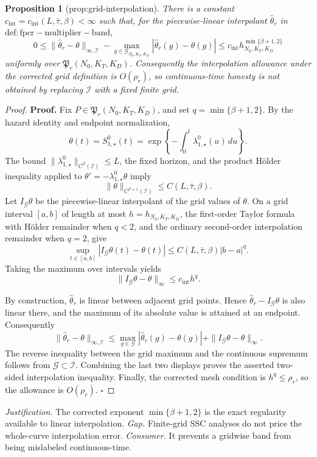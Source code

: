 \documentclass{article}
\newtheorem{proposition}{Proposition}
\begin{document}
\begin{proposition}[prop:grid-interpolation]\label{prop:grid-interpolation}
There is a constant \(c_{\mathrm{int}}=c_{\mathrm{int}}(L,\bar\tau,\beta)<\infty\) such that, for the piecewise-linear interpolant \(\widehat\theta_r\) in \(\mathrm{def:fpcr-multiplier-band}\),
\[
 0\le \|\widehat\theta_r-\theta\|_{\infty,\mathcal I}
 -\max_{g\in\mathcal G_{N_0,K_T,K_D}}|\widehat\theta_r(g)-\theta(g)|
 \le c_{\mathrm{int}}h_{N_0,K_T,K_D}^{\min\{\beta+1,2\}}
\]
uniformly over \(\mathfrak P_r(N_0,K_T,K_D)\). Consequently the interpolation allowance under the corrected grid definition is \(O(\rho_r)\), so continuous-time honesty is not obtained by replacing \(\mathcal I\) with a fixed finite grid.
\end{proposition}
\begin{proof}
\textbf{Proof.}
Fix \(P\in\mathfrak P_r(N_0,K_T,K_D)\), and set \(q=\min\{\beta+1,2\}\).  By the hazard identity and endpoint normalization,
\[
 \theta(t)=S^0_{1,\star}(t)
 =\exp\left\{-\int_0^t\lambda^0_{1,\star}(u)\,du\right\}.
\]
The bound \(\|\lambda^0_{1,\star}\|_{C^\beta(\mathcal I)}\le L\), the fixed horizon, and the product Hölder inequality applied to \(\theta'=-\lambda^0_{1,\star}\theta\) imply
\[
 \|\theta\|_{C^{\beta+1}(\mathcal I)}\le C(L,\bar\tau,\beta).
\]
Let \(I_{\mathcal G}\theta\) be the piecewise-linear interpolant of the grid values of \(\theta\).  On a grid interval \([a,b]\) of length at most \(h=h_{N_0,K_T,K_D}\), the first-order Taylor formula with Hölder remainder when \(q<2\), and the ordinary second-order interpolation remainder when \(q=2\), give
\[
 \sup_{t\in[a,b]}|I_{\mathcal G}\theta(t)-\theta(t)|
 \le C(L,\bar\tau,\beta)|b-a|^q.
\]
Taking the maximum over intervals yields
\[
 \|I_{\mathcal G}\theta-\theta\|_\infty\le c_{\mathrm{int}}h^q.
\]

By construction, \(\widehat\theta_r\) is linear between adjacent grid points.  Hence \(\widehat\theta_r-I_{\mathcal G}\theta\) is also linear there, and the maximum of its absolute value is attained at an endpoint.  Consequently
\[
 \|\widehat\theta_r-\theta\|_{\infty,\mathcal I}
 \le \max_{g\in\mathcal G}|\widehat\theta_r(g)-\theta(g)|
 +\|I_{\mathcal G}\theta-\theta\|_\infty.
\]
The reverse inequality between the grid maximum and the continuous supremum follows from \(\mathcal G\subset\mathcal I\).  Combining the last two displays proves the asserted two-sided interpolation inequality.  Finally, the corrected mesh condition is \(h^q\le\rho_r\), so the allowance is \(O(\rho_r)\). \(\square\)
\end{proof}
\par\smallskip\noindent \textit{Justification.} The corrected exponent \(\min\{\beta+1,2\}\) is the exact regularity available to linear interpolation. \textit{Gap.} Finite-grid SSC analyses do not price the whole-curve interpolation error. \textit{Consumer.} It prevents a gridwise band from being mislabeled continuous-time.
\end{document}

